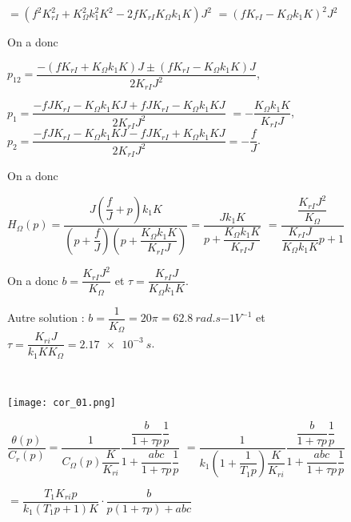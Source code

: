 \begin{multicols}{2}
\begin{corrige}
$=\left(f^2 K_{rI}^2+K_{\Omega}^2k_{1}^2K^2-2f K_{rI}K_{\Omega}k_{1}K\right)J^2  $
$=\left(f K_{rI}-K_{\Omega}k_{1}K\right)^2J^2  $

On a donc 

$p_{12} = \dfrac{-\left(f K_{rI}+K_{\Omega}k_{1}K\right)J \pm \left(f K_{rI}-K_{\Omega}k_{1}K\right)J}{2 K_{rI}J^2}$, 

$p_{1} = \dfrac{-fJ K_{rI}-K_{\Omega}k_{1}KJ + fJ K_{rI}-K_{\Omega}k_{1}KJ}{2 K_{rI}J^2}$
$= -\dfrac{K_{\Omega}k_{1}K }{ K_{rI}J}$, 
$p_{2} = \dfrac{-fJ K_{rI}-K_{\Omega}k_{1}KJ -fJ K_{rI}+K_{\Omega}k_{1}KJ}{2 K_{rI}J^2}= -\dfrac{f }{J}$.

On a donc 

$H_{\Omega}(p)=\dfrac{J\left( \dfrac{f}{J} + p \right)k_{1}K}{\left(p+\dfrac{f }{J} \right)\left(p+\dfrac{K_{\Omega}k_{1}K }{ K_{rI}J} \right)}=\dfrac{Jk_{1}K}{p+\dfrac{K_{\Omega}k_{1}K }{ K_{rI}J} }$
$=\dfrac{\dfrac{ K_{rI}J^2}{K_{\Omega} } }{\dfrac{ K_{rI}J}{K_{\Omega}k_{1}K }p+1 }$

On a donc $b=\dfrac{ K_{rI}J^2}{K_{\Omega} }$ et $\tau =\dfrac{ K_{rI}J}{K_{\Omega}k_{1}K }$.

\normalsize
Autre solution : $b=\dfrac{1}{K_{\Omega}} = 20 \pi = \SI{62,8}{rad.s{-1}V^{-1}}$ et $\tau=\dfrac{K_{ri}J}{k_1KK_{\Omega}}=\SI{2,17e-3}{s}$.


\end{corrige}
\else
\fi


\ifprof
\begin{corrige}~\\

\begin{center}
\texttt{[image: cor\_01.png]}
\end{center}

$\dfrac{\theta(p)}{C_r(p)}=\dfrac{1}{C_{\Omega}(p)\dfrac{K}{K_{ri}}}\dfrac{\dfrac{b}{1+\tau p}\dfrac{1}{p}}{1+\dfrac{abc}{1+\tau p}\dfrac{1}{p}}$ 
$=\dfrac{1}{ k_{1}\left( 1 + \dfrac{1}{T_{1}p} \right)\dfrac{K}{K_{ri}}}\dfrac{\dfrac{b}{1+\tau p}\dfrac{1}{p}}{1+\dfrac{abc}{1+\tau p}\dfrac{1}{p}}$

$=\dfrac{T_{1}K_{ri}p}{ k_{1}\left( T_{1}p + 1 \right)K}\cdot \dfrac{b}{p\left(1+\tau p \right)+abc}$


\end{corrige}
\end{multicols}
